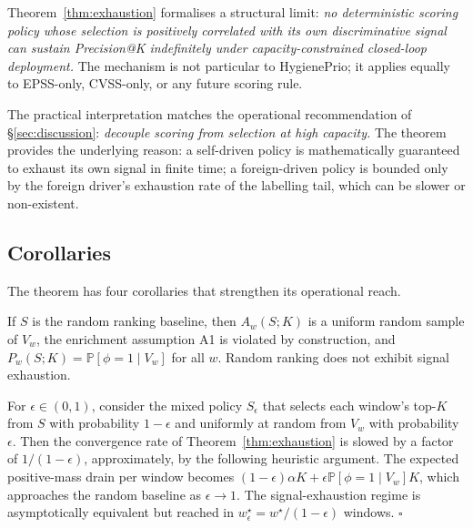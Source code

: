 Theorem~\ref{thm:exhaustion} formalises a structural limit: \emph{no
deterministic scoring policy whose selection is positively correlated
with its own discriminative signal can sustain Precision@K indefinitely
under capacity-constrained closed-loop deployment.} The mechanism is not
particular to HygienePrio; it applies equally to EPSS-only, CVSS-only,
or any future scoring rule.

The practical interpretation matches the operational recommendation of
\S\ref{sec:discussion}: \emph{decouple scoring from selection at high
capacity.} The theorem provides the underlying reason: a self-driven
policy is mathematically guaranteed to exhaust its own signal in finite
time; a foreign-driven policy is bounded only by the foreign driver's
exhaustion rate of the labelling tail, which can be slower or non-existent.

\subsection{Corollaries}

The theorem has four corollaries that strengthen its operational reach.

\begin{corollary}
\label{cor:random}
If $S$ is the random ranking baseline, then $A_w(S; K)$ is a uniform
random sample of $V_w$, the enrichment assumption A1 is violated by
construction, and $P_w(S; K) = \mathbb{P}[\phi = 1 \mid V_w]$ for all $w$.
Random ranking does not exhibit signal exhaustion.
\end{corollary}

\begin{corollary}
\label{cor:egreedy}
For $\epsilon \in (0, 1)$, consider the mixed policy $S_\epsilon$ that
selects each window's top-$K$ from $S$ with probability $1-\epsilon$
and uniformly at random from $V_w$ with probability $\epsilon$. Then
the convergence rate of Theorem~\ref{thm:exhaustion} is slowed by a
factor of $1/(1-\epsilon)$, approximately, by the following
heuristic argument. The expected
positive-mass drain per window becomes $(1-\epsilon) \alpha K
+ \epsilon \mathbb{P}[\phi=1 \mid V_w] K$, which approaches the random
baseline as $\epsilon \to 1$. The signal-exhaustion regime is
asymptotically equivalent but reached in $w^\star_\epsilon =
w^\star / (1-\epsilon)$ windows. \hfill$\square$
\end{corollary}

